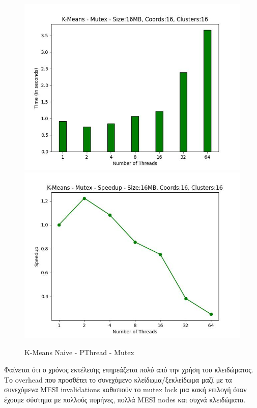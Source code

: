 \documentclass[../final_report.tex]{subfiles}
\begin{document}
\begin{figure}[H]
    \centering
        \includegraphics[scale=0.48]{outFiles/plots/kmeans_locks_pthread_mutex.jpg}
        \includegraphics[scale=0.48]{outFiles/plots/kmeans_locks_pthread_mutex_speedup.jpg}
    \caption{K-Means Naive - PThread - Mutex}
    \label{fig:K-Means Naive - PThread - Mutex}
\end{figure}

Φαίνεται ότι ο χρόνος εκτέλεσης επηρεάζεται πολύ από την χρήση του κλειδώματος. Το overhead
που προσθέτει το συνεχόμενο κλείδωμα/ξεκλείδωμα μαζί με τα συνεχόμενα MESI invalidations
καθιστούν το mutex lock μια κακή επιλογή όταν έχουμε σύστημα με πολλούς πυρήνες, πολλά MESI nodes και συχνά
κλειδώματα.
\end{document}
